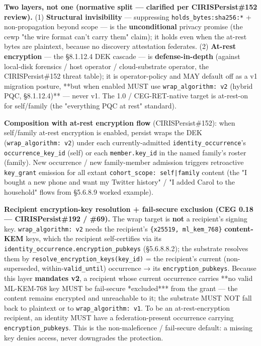 \documentclass[11pt]{article}
\begin{document}
\textbf{Two layers, not one (normative split — clarified per CIRISPersist\#152 review).} (1) \textbf{Structural invisibility} — suppressing \texttt{holds\_bytes:sha256:*} + non-propagation beyond scope — is the \textbf{unconditional} privacy promise (the cewp "the wire format can't carry them" claim); it holds even when the at-rest bytes are plaintext, because no discovery attestation federates. (2) \textbf{At-rest encryption} — the §8.1.12.4 DEK cascade — is \textbf{defense-in-depth} (against local-disk forensics / host operator / cloud-substrate operator, the CIRISPersist\#152 threat table); it is operator-policy and MAY default off as a v1 migration posture, **but when enabled MUST use \texttt{wrap\_algorithm: v2} (hybrid PQC, §8.1.12.4)** — never v1. The 1.0 / CEG-RET-native target is at-rest-on for self/family (the "everything PQC at rest" standard).


\textbf{Composition with at-rest encryption flow} (CIRISPersist\#152): when self/family at-rest encryption is enabled, persist wraps the DEK (\texttt{wrap\_algorithm: v2}) under each currently-admitted \texttt{identity\_occurrence}'s \texttt{occurrence\_key\_id} (self) or each \texttt{member.key\_id} in the named family's roster (family). New occurrence / new family-member admission triggers retroactive \texttt{key\_grant} emission for all extant \texttt{cohort\_scope: self|family} content (the "I bought a new phone and want my Twitter history" / "I added Carol to the household" flows from §5.6.8.9 worked example).


\textbf{Recipient encryption-key resolution + fail-secure exclusion (CEG 0.18 — CIRISPersist\#192 / \#69).} The wrap target is \textbf{not} a recipient's signing key. \texttt{wrap\_algorithm: v2} needs the recipient's \texttt{\{x25519, ml\_kem\_768\}} \textbf{content-KEM} keys, which the recipient self-certifies via its \texttt{identity\_occurrence.encryption\_pubkeys} (§5.6.8.8.2); the substrate resolves them by \texttt{resolve\_encryption\_keys(key\_id)} = the recipient's current (non-superseded, within-\texttt{valid\_until}) occurrence → its \texttt{encryption\_pubkeys}. Because this layer \textbf{mandates v2}, a recipient whose current occurrence carries **no valid ML-KEM-768 key MUST be fail-secure *excluded*** from the grant — the content remains encrypted and unreachable to it; the substrate MUST NOT fall back to plaintext or to \texttt{wrap\_algorithm: v1}. To be an at-rest-encryption recipient, an identity MUST have a federation-present occurrence carrying \texttt{encryption\_pubkeys}. This is the non-maleficence / fail-secure default: a missing key denies access, never downgrades the protection.
\end{document}
